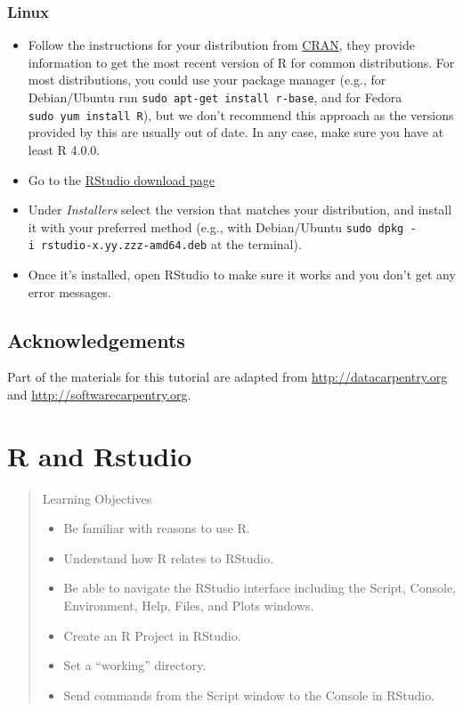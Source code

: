 \documentclass[
]{book}
\providecommand{\tightlist}{%
  \setlength{\itemsep}{0pt}\setlength{\parskip}{0pt}}
\begin{document}
\hypertarget{linux}{%
\subsection*{Linux}\label{linux}}

\begin{itemize}
\tightlist
\item
  Follow the instructions for your distribution
  from \href{https://cloud.r-project.org/bin/linux}{CRAN}, they provide information
  to get the most recent version of R for common distributions. For most
  distributions, you could use your package manager (e.g., for Debian/Ubuntu run
  \texttt{sudo\ apt-get\ install\ r-base}, and for Fedora \texttt{sudo\ yum\ install\ R}), but we
  don't recommend this approach as the versions provided by this are
  usually out of date. In any case, make sure you have at least R 4.0.0.
\item
  Go to the
  \href{https://www.rstudio.com/products/rstudio/download/\#download}{RStudio download page}
\item
  Under \emph{Installers} select the version that matches your distribution, and
  install it with your preferred method (e.g., with Debian/Ubuntu \texttt{sudo\ dpkg\ -i\ rstudio-x.yy.zzz-amd64.deb} at the terminal).
\item
  Once it's installed, open RStudio to make sure it works and you don't get any
  error messages.
\end{itemize}

\hypertarget{acknowledgements}{%
\section*{Acknowledgements}\label{acknowledgements}}

Part of the materials for this tutorial are adapted from \url{http://datacarpentry.org} and \url{http://softwarecarpentry.org}.

\hypertarget{backgroud}{%
\chapter{R and Rstudio}\label{backgroud}}

\begin{quote}
Learning Objectives

\begin{itemize}
\tightlist
\item
  Be familiar with reasons to use R.
\item
  Understand how R relates to RStudio.
\item
  Be able to navigate the RStudio interface including the Script, Console, Environment, Help, Files, and Plots windows.
\item
  Create an R Project in RStudio.
\item
  Set a ``working'' directory.
\item
  Send commands from the Script window to the Console in RStudio.
\end{itemize}
\end{quote}
\end{document}
